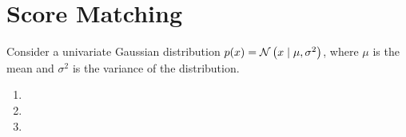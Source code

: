 \section{Score Matching}

Consider a univariate Gaussian distribution $p(x) = \mathcal{N}\left(x \mid \mu, \sigma^2\right)$, where $\mu$ is the mean and $\sigma^2$ is the variance of the distribution.

\begin{enumerate}[label=(\alph*)]
    \item 

    \item 

    \item 
\end{enumerate}